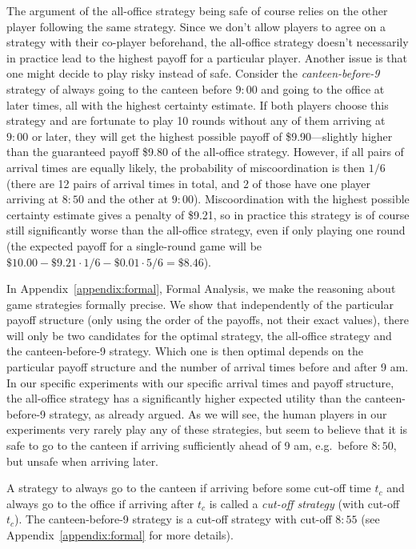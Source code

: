 \documentclass[twocolumn,a4paper,superscriptaddress,nofootinbib]{revtex4}
\newcommand{\tobo}[1]{{\color{red} TOBO: #1}}
\newcommand{\tsn}[1]{{\color{blue} TSN: #1}}
\begin{document}
The argument of the all-office strategy being safe of course relies on the other player following the same strategy. Since we don't allow players to agree on a strategy with their co-player beforehand, the all-office strategy doesn't necessarily in practice lead to the highest payoff for a particular player. Another issue is that one might decide to play risky instead of safe. Consider the \emph{canteen-before-9} strategy of always going to the canteen before $9{:}00$ and going to the office at later times, all with the highest certainty estimate. If both players choose this strategy and are fortunate to play 10 rounds without any of them arriving  at $9{:}00$ or later, they will get the highest possible payoff of \$9.90---slightly higher than the guaranteed payoff \$9.80 of the all-office strategy. However, if all pairs of arrival times are equally likely, the probability of miscoordination is then $1/6$ (there are 12 pairs of arrival times in total, and 2 of those have one player arriving at $8{:}50$ and the other at $9{:}00$). Miscoordination with the highest possible certainty estimate gives a penalty of \$9.21, so in practice this strategy is of course still significantly worse than the all-office strategy, even if only playing one round (the expected payoff for a single-round game will be $\$10.00 - \$9.21\cdot 1/6 - \$0.01\cdot 5/6 = \$8.46$).

In Appendix~\ref{appendix:formal}, Formal Analysis, 
we make the reasoning about game strategies formally precise. We show that independently of the particular payoff structure (only using the order of the payoffs, not their exact values), there will only be two candidates for the optimal strategy, the all-office strategy and the canteen-before-9 strategy. Which one is then optimal depends on the particular payoff structure and the number of arrival times before and after 9 am. In our specific experiments with our specific arrival times and payoff structure, the all-office strategy has a significantly higher expected utility than the canteen-before-9 strategy, as already argued. As we will see, the human players in our experiments very rarely play any of these strategies, but seem to believe that it is safe to go to the canteen if arriving sufficiently ahead of 9 am, e.g.\ before $8{:}50$, but unsafe when arriving later.

A strategy to always go to the canteen if arriving before some cut-off time $t_c$ and always go to the office if arriving after $t_c$ is called a \emph{cut-off strategy} (with cut-off $t_c$). The canteen-before-9 strategy is a cut-off strategy with cut-off $8{:}55$ (see Appendix~\ref{appendix:formal} for more details).
\end{document}
